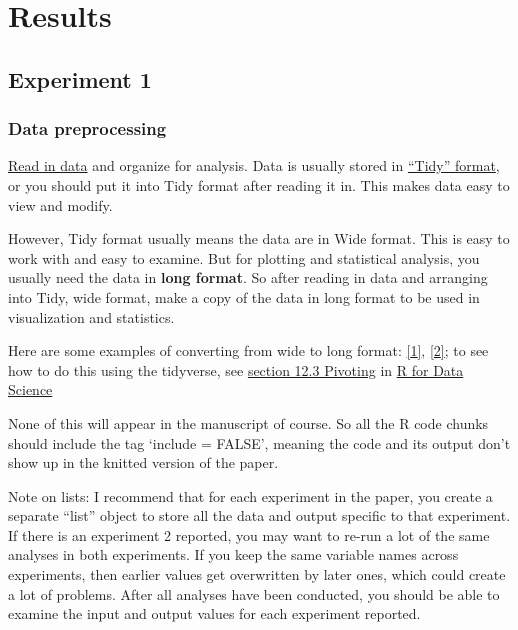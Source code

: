 \documentclass[
]{book}
\begin{document}
\hypertarget{results}{%
\section{Results}\label{results}}

\hypertarget{experiment-1}{%
\subsection{Experiment 1}\label{experiment-1}}

\hypertarget{data-preprocessing}{%
\subsubsection{Data preprocessing}\label{data-preprocessing}}

\href{https://r4ds.had.co.nz/data-import.html}{Read in data} and organize for analysis. Data is usually stored in \href{https://r4ds.had.co.nz/tidy-data.html}{``Tidy'' format}, or you should put it into Tidy format after reading it in. This makes data easy to view and modify.

However, Tidy format usually means the data are in Wide format. This is easy to work with and easy to examine. But for plotting and statistical analysis, you usually need the data in \textbf{long format}. So after reading in data and arranging into Tidy, wide format, make a copy of the data in long format to be used in visualization and statistics.

Here are some examples of converting from wide to long format: \href{https://www.theanalysisfactor.com/wide-and-long-data/}{{[}1{]}}, \href{http://www.cookbook-r.com/Manipulating_data/Converting_data_between_wide_and_long_format/}{{[}2{]}}; to see how to do this using the tidyverse, see \href{https://r4ds.had.co.nz/tidy-data.html\#pivoting}{section 12.3 Pivoting} in \href{https://r4ds.had.co.nz/}{R for Data Science}

None of this will appear in the manuscript of course. So all the R code chunks should include the tag `include = FALSE', meaning the code and its output don't show up in the knitted version of the paper.

Note on lists: I recommend that for each experiment in the paper, you create a separate ``list'' object to store all the data and output specific to that experiment. If there is an experiment 2 reported, you may want to re-run a lot of the same analyses in both experiments. If you keep the same variable names across experiments, then earlier values get overwritten by later ones, which could create a lot of problems. After all analyses have been conducted, you should be able to examine the input and output values for each experiment reported.
\end{document}
